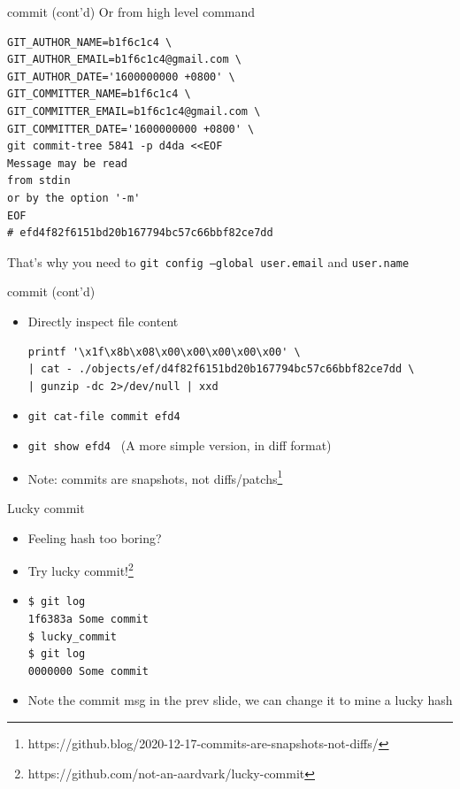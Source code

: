 \documentclass[aspectratio=169]{beamer}
\newcommand{\T}[1]{\texttt{#1}}
\begin{document}
\begin{frame}[fragile]{commit (cont'd)}
  Or from high level command\begin{verbatim}
GIT_AUTHOR_NAME=b1f6c1c4 \
GIT_AUTHOR_EMAIL=b1f6c1c4@gmail.com \
GIT_AUTHOR_DATE='1600000000 +0800' \
GIT_COMMITTER_NAME=b1f6c1c4 \
GIT_COMMITTER_EMAIL=b1f6c1c4@gmail.com \
GIT_COMMITTER_DATE='1600000000 +0800' \
git commit-tree 5841 -p d4da <<EOF
Message may be read
from stdin
or by the option '-m'
EOF
# efd4f82f6151bd20b167794bc57c66bbf82ce7dd
\end{verbatim}
  That's why you need to \T{git config --global user.email} and \T{user.name}
\end{frame}

\begin{frame}[fragile]{commit (cont'd)}
  \begin{itemize}
    \item<1-> Directly inspect file content\begin{verbatim}
printf '\x1f\x8b\x08\x00\x00\x00\x00\x00' \
| cat - ./objects/ef/d4f82f6151bd20b167794bc57c66bbf82ce7dd \
| gunzip -dc 2>/dev/null | xxd
\end{verbatim}
    \item<2-> \T{git cat-file commit efd4}
    \item<3-> \T{git show efd4~} (A more simple version, in diff format)
    \item<3-> Note: commits are snapshots, not diffs/patchs\footnote{https://github.blog/2020-12-17-commits-are-snapshots-not-diffs/}
  \end{itemize}
\end{frame}

\begin{frame}[fragile]{Lucky commit}
  \begin{itemize}
    \item Feeling hash too boring?
    \item Try lucky commit!\footnote{https://github.com/not-an-aardvark/lucky-commit}
    \item \begin{verbatim}
$ git log
1f6383a Some commit
$ lucky_commit
$ git log
0000000 Some commit
\end{verbatim}
    \item Note the commit msg in the prev slide, we can change it to mine a lucky hash
  \end{itemize}
\end{frame}
\end{document}
